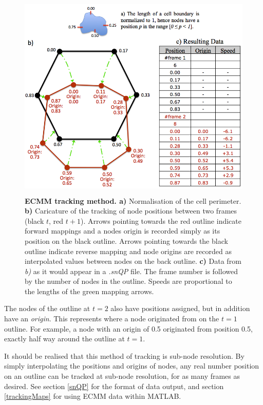 \documentclass[a4paper,12pt]{article}
\begin{document}
\begin{figure}[ht]
   \centering
   \includegraphics[height=10cm]{ecmm.png}
   \caption{\textbf{ECMM tracking method. a)} Normalisation of the cell perimeter. \textbf{b)} Caricature of the tracking of node positions
   between two frames (black $t$, red $t+1$). Arrows pointing towards the red outline indicate forward mappings and a nodes origin is recorded simply
   as its position on the black outline. Arrows pointing towards the black outline indicate reverse mapping and node origins
   are recorded as interpolated values between nodes on the back outline.
    \textbf{c)} Data from \textit{b)} as it would appear in a \textit{.snQP} file. The frame number is followed by the number of nodes in the outline.
    Speeds are proportional to the lengths of the green mapping arrows.}
   \label{ecmm}
\end{figure}


The nodes of the outline at $t=2$ also have positions assigned, but in addition have an \textit{origin}.  This represents 
where a node originated from on the $t=1$ outline.  For example, a node with an origin of 0.5 originated from 
position 0.5, exactly half way around the outline at $t=1$.

It should be realised that this method of tracking is sub-node resolution.  By simply interpolating the positions and origins of 
nodes, any real number position on an outline can be tracked at sub-node resolution, for as many frames as desired.  See section
\ref{snQP} for the format of data output, and section \ref{trackingMaps} for using ECMM data within MATLAB.
\end{document}
